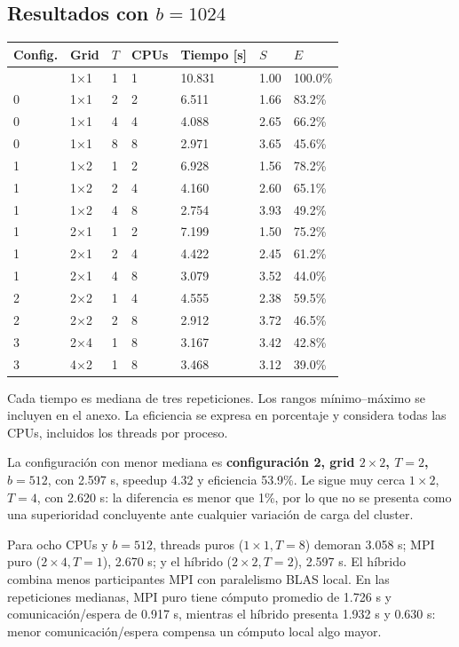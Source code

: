 \documentclass[
  spanish,
  11pt,
  a4paper,
]{article}
\newcounter{none} %
\begin{document}
\subsection{\texorpdfstring{Resultados con
\(b=1024\)}{Resultados con b=1024}}\label{resultados-con-b1024}

{\def\LTcaptype{none} %
\begin{longtable}[]{@{}lllllll@{}}
\toprule\noalign{}
Config. & Grid & \(T\) & CPUs & Tiempo {[}s{]} & \(S\) & \(E\) \\
\midrule\noalign{}
\endhead
\bottomrule\noalign{}
\endlastfoot
0 & 1×1 & 1 & 1 & 10.831 & 1.00 & 100.0\% \\
0 & 1×1 & 2 & 2 & 6.511 & 1.66 & 83.2\% \\
0 & 1×1 & 4 & 4 & 4.088 & 2.65 & 66.2\% \\
0 & 1×1 & 8 & 8 & 2.971 & 3.65 & 45.6\% \\
1 & 1×2 & 1 & 2 & 6.928 & 1.56 & 78.2\% \\
1 & 1×2 & 2 & 4 & 4.160 & 2.60 & 65.1\% \\
1 & 1×2 & 4 & 8 & 2.754 & 3.93 & 49.2\% \\
1 & 2×1 & 1 & 2 & 7.199 & 1.50 & 75.2\% \\
1 & 2×1 & 2 & 4 & 4.422 & 2.45 & 61.2\% \\
1 & 2×1 & 4 & 8 & 3.079 & 3.52 & 44.0\% \\
2 & 2×2 & 1 & 4 & 4.555 & 2.38 & 59.5\% \\
2 & 2×2 & 2 & 8 & 2.912 & 3.72 & 46.5\% \\
3 & 2×4 & 1 & 8 & 3.167 & 3.42 & 42.8\% \\
3 & 4×2 & 1 & 8 & 3.468 & 3.12 & 39.0\% \\
\end{longtable}
}

Cada tiempo es mediana de tres repeticiones. Los rangos mínimo--máximo
se incluyen en el anexo. La eficiencia se expresa en porcentaje y
considera todas las CPUs, incluidos los threads por proceso.

La configuración con menor mediana es \textbf{configuración 2, grid
\(2\times2\), \(T=2\), \(b=512\)}, con 2.597 s, speedup 4.32 y
eficiencia 53.9\%. Le sigue muy cerca \(1\times2\), \(T=4\), con 2.620
s: la diferencia es menor que 1\%, por lo que no se presenta como una
superioridad concluyente ante cualquier variación de carga del cluster.

Para ocho CPUs y \(b=512\), threads puros (\(1\times1,T=8\)) demoran
3.058 s; MPI puro (\(2\times4,T=1\)), 2.670 s; y el híbrido
(\(2\times2,T=2\)), 2.597 s. El híbrido combina menos participantes MPI
con paralelismo BLAS local. En las repeticiones medianas, MPI puro tiene
cómputo promedio de 1.726 s y comunicación/espera de 0.917 s, mientras
el híbrido presenta 1.932 s y 0.630 s: menor comunicación/espera
compensa un cómputo local algo mayor.
\end{document}
